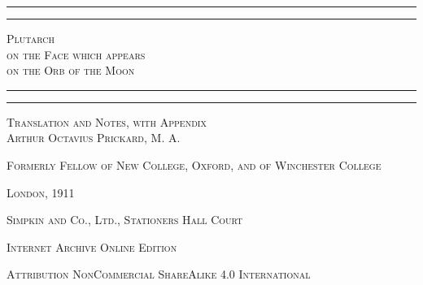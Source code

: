 \documentclass[a4paper, 11pt, oneside, polutonikogreek, english]{article}
\begin{document}
\begin{titlepage} %
	\centering %


	\rule{\textwidth}{1.6pt}\vspace*{-\baselineskip}\vspace*{2pt} %
	\rule{\textwidth}{0.4pt} %
	
	\vspace{1\baselineskip} %
	
	{\scshape\Huge Plutarch \\ on the Face which appears \\ on the Orb of the Moon}
	
	\vspace{1\baselineskip} %

	\rule{\textwidth}{0.4pt}\vspace*{-\baselineskip}\vspace{3.2pt} %
	\rule{\textwidth}{1.6pt} %
	
	\vspace{1\baselineskip} %
	
	
	{\scshape\small Translation and Notes, with Appendix \\ \Large
Arthur Octavius Prickard, \small M. A.}
 
        \vspace{0.5\baselineskip}
		
        {\scshape \small Formerly Fellow of New College, Oxford, and of Winchester College} %

        \vspace*{\fill}    

	\vspace{1\baselineskip}

	{\small\scshape London, 1911}
	
	{\small\scshape{Simpkin and Co., Ltd., Stationers Hall Court}}
	
	\vspace{0.5\baselineskip} %

        {\scshape Internet Archive Online Edition}%
    
	{\scshape\small Attribution NonCommercial ShareAlike 4.0 International } %
\end{titlepage}
\end{document}
